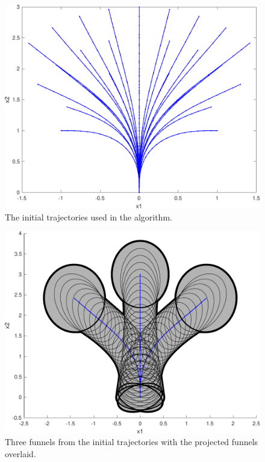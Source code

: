 \begin{figure}
  \centering
  \includegraphics[scale=.7]{figures/experiments/initial-trajectories}
  \caption{The initial trajectories used in the \rrtfunnel{} algorithm.}
  \label{fig:intial-trajectories-exp}
\end{figure}

\begin{figure}
  \centering
  \includegraphics[scale=.7]{figures/experiments/sample-funnel-overlay} \caption{Three
    funnels from the initial trajectories with the projected funnels overlaid.}
  \label{fig:sample-funnel-overlay}
\end{figure}

